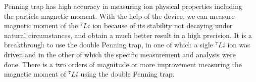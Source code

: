 Penning trap has high accuracy in measuring ion physical properties including the particle magnetic moment. With the help of the device, we can measure magnetic moment of the ${}^{7}Li$ ion because of its stability not decaying under natural circumstances, and obtain a much better result in a high precision. It is a breakthrough to use the double Penning trap, in one of which a sigle ${}^{7}Li$ ion was driven,and in the other of which the specific measurement and analysis were done. There is a two orders of magnitude or more improvement measuring the  magnetic moment of ${}^{7}Li$ using the double Penning trap. 
